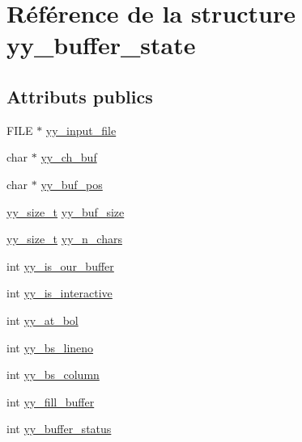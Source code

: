 \hypertarget{structyy__buffer__state}{}\section{Référence de la structure yy\+\_\+buffer\+\_\+state}
\label{structyy__buffer__state}
\subsection*{Attributs publics}
\begin{DoxyCompactItemize}
\item 
F\+I\+L\+E $\ast$ \hyperlink{structyy__buffer__state_a4360acfb226a1fc240ab2be17dd6beda}{yy\+\_\+input\+\_\+file}
\item 
char $\ast$ \hyperlink{structyy__buffer__state_a0d25458e69eb22207fc633a1255d099d}{yy\+\_\+ch\+\_\+buf}
\item 
char $\ast$ \hyperlink{structyy__buffer__state_a8435c3f786bbb55d21d0174e4cfc22a0}{yy\+\_\+buf\+\_\+pos}
\item 
\hyperlink{code_8cpp_ad557845057f187eec4be07e2717d2afa}{yy\+\_\+size\+\_\+t} \hyperlink{structyy__buffer__state_a48302f5f3477a9c78bbddf56d356ef54}{yy\+\_\+buf\+\_\+size}
\item 
\hyperlink{code_8cpp_ad557845057f187eec4be07e2717d2afa}{yy\+\_\+size\+\_\+t} \hyperlink{structyy__buffer__state_afcc44872643f513e79b43c2b1f334a67}{yy\+\_\+n\+\_\+chars}
\item 
int \hyperlink{structyy__buffer__state_a80ce2431c70dc4f89ced487f18449465}{yy\+\_\+is\+\_\+our\+\_\+buffer}
\item 
int \hyperlink{structyy__buffer__state_abf5c70eea75581b58c0ee7bd31b14490}{yy\+\_\+is\+\_\+interactive}
\item 
int \hyperlink{structyy__buffer__state_a9d60c60af6e1a6f69de16871fd64f85f}{yy\+\_\+at\+\_\+bol}
\item 
int \hyperlink{structyy__buffer__state_a818e94bc9c766e683c60df1e9fd01199}{yy\+\_\+bs\+\_\+lineno}
\item 
int \hyperlink{structyy__buffer__state_a10c4fcd8be759e6bf11e6d3e8cdb0307}{yy\+\_\+bs\+\_\+column}
\item 
int \hyperlink{structyy__buffer__state_a63d2afbb1d79a3fc63df9e12626f827d}{yy\+\_\+fill\+\_\+buffer}
\item 
int \hyperlink{structyy__buffer__state_a70fd925d37a2f0454fbd0def675d106c}{yy\+\_\+buffer\+\_\+status}
\end{DoxyCompactItemize}


